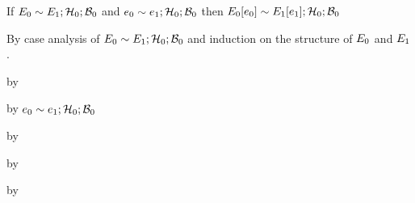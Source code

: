 \begin{lemma}\label{AT-ctx-subst}
  If\/ $E_0 \sim E_1; \mathcal{H}_0; \mathcal{B}_0$
  and\/ $e_0 \sim e_1; \mathcal{H}_0; \mathcal{B}_0$
  then\/ $E_0[e_0] \sim E_1[e_1]; \mathcal{H}_0; \mathcal{B}_0$
\end{lemma}
\begin{lamportproof}
  By case analysis of $E_0 \sim E_1; \mathcal{H}_0; \mathcal{B}_0$
  and induction on the structure of $E_0$ and $E_1$.

    \begin{pfproof}
      \qedstep
        \begin{pfproof}
          by \pfih
        \end{pfproof}
    \end{pfproof}

    \begin{pfproof}
      \qedstep
        \begin{pfproof}
          by $e_0 \sim e_1; \mathcal{H}_0; \mathcal{B}_0$
        \end{pfproof}
    \end{pfproof}

    \begin{pfproof}
      \qedstep
        \begin{pfproof}
          by \pfih
        \end{pfproof}
    \end{pfproof}

    \begin{pfproof}
      \qedstep
        \begin{pfproof}
          by \pfih
        \end{pfproof}
    \end{pfproof}

    \begin{pfproof}
      \qedstep
        \begin{pfproof}
          by \pfih
        \end{pfproof}
    \end{pfproof}


\end{lamportproof}
